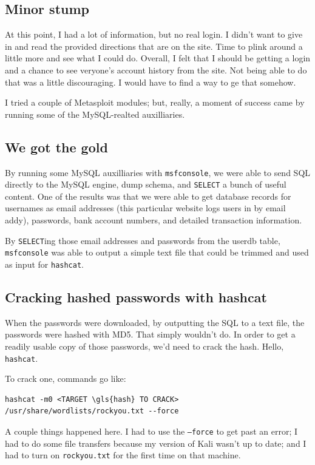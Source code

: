 \subsection{Minor stump}
At this point, I had a lot of information, but no real login.  I didn't want to give in and read the provided directions that are on the site.  Time to plink around a little more and see what I could do.  Overall, I felt that I should be getting a login and a chance to see veryone's account history from the site.  Not being able to do that was a little discouraging.  I would have to find a way to ge that somehow.

I tried a couple of Metasploit modules; but, really, a moment of success came by running some of the MySQL-realted auxilliaries.

\subsection{We got the gold}

By running some MySQL auxilliaries with \texttt{msfconsole}, we were able to send SQL directly to the MySQL engine, dump schema, and \texttt{SELECT} a bunch of useful content.  One of the results was that we were able to get \gls{database} records for usernames as email addresses (this particular website logs users in by email addy), \gls{password}s, bank account numbers, and detailed transaction information. 

By \texttt{SELECT}ing those email addresses and \gls{password}s from the userdb table, \texttt{msfconsole} was able to output a simple text file that could be trimmed and used as input for \texttt{hashcat}. 


\subsection{Cracking hashed passwords with hashcat}
When the \gls{password}s were downloaded, by outputting the SQL to a text file, the \gls{password}s were hashed with MD5.  That simply wouldn't do.  In order to get a readily usable copy of those \gls{password}s, we'd need to crack the \gls{hash}.  Hello, \texttt{hashcat}.

To crack one, commands go like:
\begin{lstlisting}
hashcat -m0 <TARGET \gls{hash} TO CRACK> /usr/share/wordlists/rockyou.txt --force
\end{lstlisting}

A couple things happened here.  I had to use the \texttt{--force} to get past an error; I had to do some file transfers because my version of Kali wasn't up to date; and I had to turn on \texttt{rockyou.txt} for the first time on that machine.  


